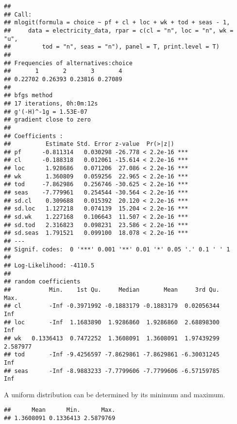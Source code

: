 \documentclass[
]{article}
\newenvironment{Shaded}{\begin{snugshade}}{\end{snugshade}}
\newcommand{\DecValTok}[1]{\textcolor[rgb]{0.00,0.00,0.81}{#1}}
\newcommand{\KeywordTok}[1]{\textcolor[rgb]{0.13,0.29,0.53}{\textbf{#1}}}
\newcommand{\NormalTok}[1]{#1}
\newcommand{\OperatorTok}[1]{\textcolor[rgb]{0.81,0.36,0.00}{\textbf{#1}}}
\newcommand{\StringTok}[1]{\textcolor[rgb]{0.31,0.60,0.02}{#1}}
\begin{document}
\begin{verbatim}
## 
## Call:
## mlogit(formula = choice ~ pf + cl + loc + wk + tod + seas - 1, 
##     data = electricity_data, rpar = c(cl = "n", loc = "n", wk = "u", 
##         tod = "n", seas = "n"), panel = T, print.level = T)
## 
## Frequencies of alternatives:choice
##       1       2       3       4 
## 0.22702 0.26393 0.23816 0.27089 
## 
## bfgs method
## 17 iterations, 0h:0m:12s 
## g'(-H)^-1g = 1.53E-07 
## gradient close to zero 
## 
## Coefficients :
##          Estimate Std. Error z-value  Pr(>|z|)    
## pf      -0.811314   0.030298 -26.778 < 2.2e-16 ***
## cl      -0.188318   0.012061 -15.614 < 2.2e-16 ***
## loc      1.928686   0.071206  27.086 < 2.2e-16 ***
## wk       1.360809   0.059256  22.965 < 2.2e-16 ***
## tod     -7.862986   0.256746 -30.625 < 2.2e-16 ***
## seas    -7.779961   0.254544 -30.564 < 2.2e-16 ***
## sd.cl    0.309688   0.015392  20.120 < 2.2e-16 ***
## sd.loc   1.127218   0.074139  15.204 < 2.2e-16 ***
## sd.wk    1.227168   0.106643  11.507 < 2.2e-16 ***
## sd.tod   2.316823   0.098231  23.586 < 2.2e-16 ***
## sd.seas  1.791521   0.099100  18.078 < 2.2e-16 ***
## ---
## Signif. codes:  0 '***' 0.001 '**' 0.01 '*' 0.05 '.' 0.1 ' ' 1
## 
## Log-Likelihood: -4110.5
## 
## random coefficients
##           Min.    1st Qu.     Median       Mean     3rd Qu.     Max.
## cl        -Inf -0.3971992 -0.1883179 -0.1883179  0.02056344      Inf
## loc       -Inf  1.1683890  1.9286860  1.9286860  2.68898300      Inf
## wk   0.1336413  0.7472252  1.3608091  1.3608091  1.97439299 2.587977
## tod       -Inf -9.4256597 -7.8629861 -7.8629861 -6.30031245      Inf
## seas      -Inf -8.9883233 -7.7799606 -7.7799606 -6.57159785      Inf
\end{verbatim}


A uniform distribution can be determined by its minimum and maximum.

\begin{Shaded}
\end{Shaded}

\begin{verbatim}
##      Mean      Min.      Max. 
## 1.3608091 0.1336413 2.5879769
\end{verbatim}
\end{document}
